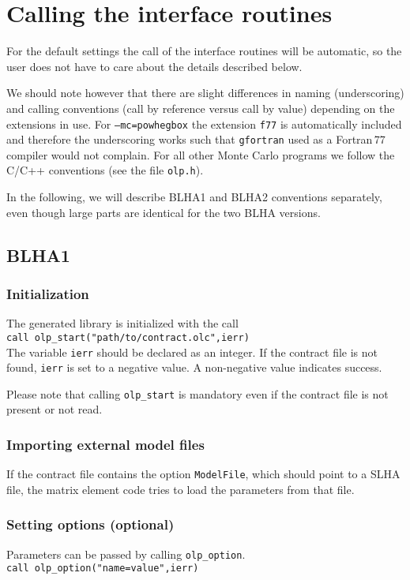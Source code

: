 \section{Calling the interface routines}

For the default settings the call of the interface routines 
will be automatic, so the user does not have to care about the details described below.

We should note however that there are slight differences in naming (underscoring) and calling
conventions (call by reference versus call by value) depending on the
extensions in use. For \texttt{--mc=powhegbox} the extension \texttt{f77}
is automatically included and therefore the underscoring works such that
\texttt{gfortran} used as a Fortran\,77 compiler would not complain.
For all other Monte Carlo programs we follow the C/C++ conventions
(see the file \texttt{olp.h}).

In the following, we will describe BLHA1 and BLHA2 conventions separately, 
even though large parts are identical for the two BLHA versions.

\subsection{BLHA1}

\subsubsection{Initialization}
The generated \gosam{} library is initialized with the call\\
{\tt        call olp\_start("path/to/contract.olc",ierr)}\\
The variable \texttt{ierr} should be declared as an integer. If the contract
file is not found, \texttt{ierr} is set to a negative value. A non-negative
value indicates success.

Please note that calling \texttt{olp\_start} is mandatory even if the contract
file is not present or not read.

\subsubsection{Importing external model files}
If the contract file contains the option
\texttt{ModelFile}, which should point to a SLHA file,
the matrix element code tries to load the parameters from that file.

\subsubsection{Setting options (optional)}
Parameters can be passed by calling \texttt{olp\_option}.\\
{\tt        call olp\_option("name=value",ierr)}

